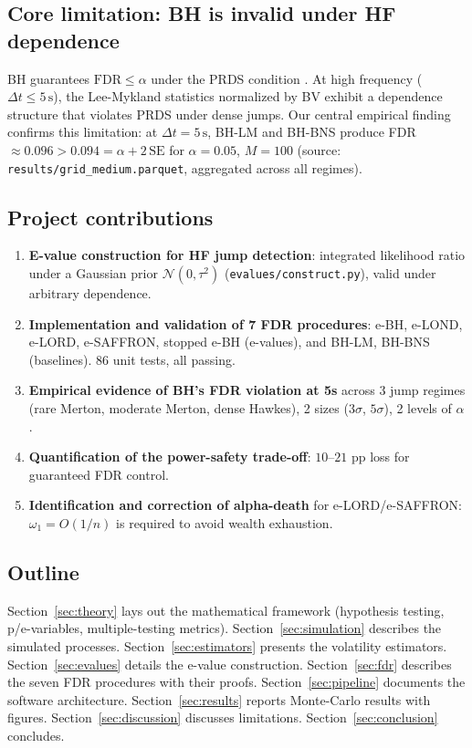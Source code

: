 \documentclass[11pt,a4paper]{article}
\theoremstyle{plain}
\theoremstyle{definition}
\theoremstyle{remark}
\newcommand{\dt}{\Delta}
\newcommand{\FDR}{\mathrm{FDR}}
\begin{document}
\subsection{Core limitation: BH is invalid under HF dependence}

BH guarantees $\FDR \le \alpha$ under the PRDS condition \cite{BY2001}. At
high frequency ($\dt t \le 5\,\mathrm{s}$), the Lee-Mykland statistics normalized
by BV exhibit a dependence structure that violates PRDS under dense jumps.
Our central empirical finding confirms this limitation: at
$\dt t = 5\,\mathrm{s}$, BH-LM and BH-BNS produce
FDR $\approx 0.096 > 0.094 = \alpha + 2\,\mathrm{SE}$ for $\alpha = 0.05$,
$M = 100$ (source: \texttt{results/grid\_medium.parquet}, aggregated across
all regimes).

\subsection{Project contributions}

\begin{enumerate}
  \item \textbf{E-value construction for HF jump detection}: integrated
    likelihood ratio under a Gaussian prior $\mathcal{N}(0, \tau^2)$
    (\texttt{evalues/construct.py}), valid under arbitrary dependence.
  \item \textbf{Implementation and validation of 7 FDR procedures}: e-BH,
    e-LOND, e-LORD, e-SAFFRON, stopped e-BH (e-values), and BH-LM, BH-BNS
    (baselines). 86 unit tests, all passing.
  \item \textbf{Empirical evidence of BH's FDR violation at 5s} across
    3 jump regimes (rare Merton, moderate Merton, dense Hawkes), 2 sizes
    ($3\sigma$, $5\sigma$), 2 levels of $\alpha$.
  \item \textbf{Quantification of the power-safety trade-off}: $10$--$21$ pp
    loss for guaranteed FDR control.
  \item \textbf{Identification and correction of alpha-death} for
    e-LORD/e-SAFFRON: $\omega_1 = O(1/n)$ is required to avoid wealth
    exhaustion.
\end{enumerate}

\subsection{Outline}

Section~\ref{sec:theory} lays out the mathematical framework
(hypothesis testing, p/e-variables, multiple-testing metrics).
Section~\ref{sec:simulation} describes the simulated processes.
Section~\ref{sec:estimators} presents the volatility estimators.
Section~\ref{sec:evalues} details the e-value construction.
Section~\ref{sec:fdr} describes the seven FDR procedures with their proofs.
Section~\ref{sec:pipeline} documents the software architecture.
Section~\ref{sec:results} reports Monte-Carlo results with figures.
Section~\ref{sec:discussion} discusses limitations.
Section~\ref{sec:conclusion} concludes.
\end{document}
